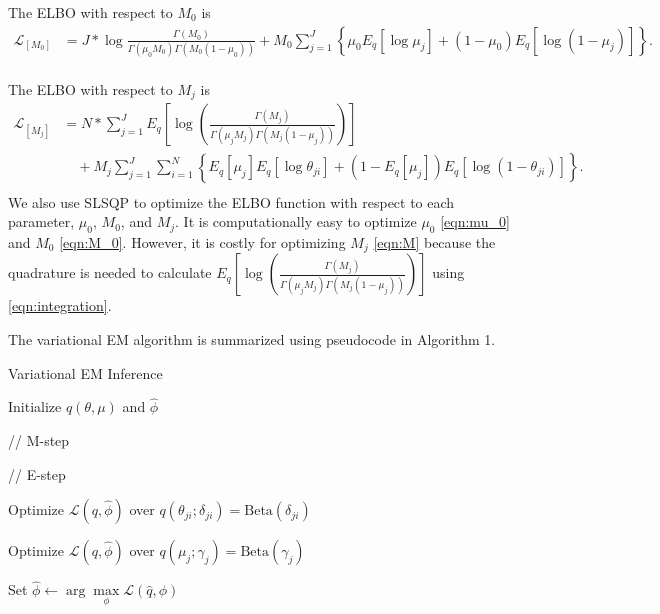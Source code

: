 \documentclass{bmcart}
\begin{document}
The ELBO with respect to $ M_0 $ is
\begin{equation}\label{eqn:M_0}
\begin{split}
\mathcal{L}_{[M_0]}
&=J* \log \frac{ \Gamma(M_0) } { \Gamma(\mu_0 M_0) \Gamma(M_0 (1-\mu_0))}
+ M_0 \sum_{j=1}^{J} \left\lbrace \mu_0E_q  \left[ \log \mu_j \right] + ( 1 - \mu_0) E_q  \left[ \log (1 - \mu_j)\right]\right\rbrace.  \\
\end{split}
\end{equation}


The ELBO with respect to $M_j$ is
\begin{equation}\label{eqn:M}
\begin{split}
\mathcal{L}_{{[M_j]}}
&= N* \sum_{j=1}^{J} E_q  \left[ \log \left( \frac{ \Gamma(M_j) } { \Gamma(\mu_j M_j) \Gamma(M_j (1-\mu_j)) }\right) \right] \\
&\quad + M_j \sum_{j=1}^{J} \sum_{i=1}^{N} \left\lbrace E_q \left[ \mu_j \right] E_q \left[ \log \theta_{ji} \right] + \left( 1 - E_q\left[ \mu_j \right]  \right) E_q\left[ \log \left( 1 - \theta_{ji}\right) \right] \right\rbrace. \\
\end{split}
\end{equation}
We also use SLSQP to optimize the ELBO function with respect to each parameter, $\mu_0$, $M_0$, and $M_j$.
It is computationally easy to optimize $\mu_0$ \eqref{eqn:mu_0} and $M_0$ \eqref{eqn:M_0}.
However, it is costly for optimizing $M_j$ \eqref{eqn:M} because the quadrature is needed to calculate $ E_q\left[ \log \left( \frac{ \Gamma(M_j) } { \Gamma(\mu_j M_j) \Gamma(M_j (1-\mu_j)) }\right)\right] $ using \eqref{eqn:integration}.

The variational EM algorithm is summarized using pseudocode in Algorithm 1.
\begin{algorithm}[ht]
  \caption{Variational EM Inference}

  \begin{algorithmic}[1]

  \State Initialize $q(\theta, \mu)$ and $\hat{\phi}$

  \State // M-step

  \Repeat

    \State // E-step

	\Repeat

			\State Optimize $\mathcal{L}(q, \hat{\phi})$ over $q(\theta_{ji}; \delta_{ji}) = \text{Beta} (\delta_{ji})$
			\EndFor
		\EndFor

            \State Optimize $\mathcal{L}(q, \hat{\phi})$ over $q(\mu_j; \gamma_j) = \text{Beta} (\gamma_j)$
        \EndFor


    \State Set $\hat{\phi} \leftarrow \arg \max\limits_{\phi}
            \mathcal{L}(\hat{q},\phi)$

  \end{algorithmic}

\end{algorithm}
%
\end{document}
